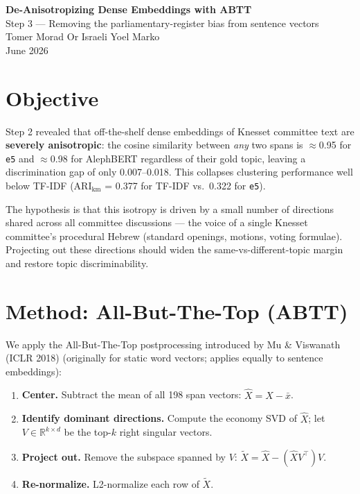 \documentclass[11pt,a4paper]{article}
\begin{document}
\begin{center}
  {\LARGE \textbf{De-Anisotropizing Dense Embeddings with ABTT}}\\[0.3em]
  {\large Step 3 --- Removing the parliamentary-register bias from sentence vectors}\\[0.6em]
  {\normalsize Tomer Morad \quad Or Israeli \quad Yoel Marko}\\
  {\normalsize June 2026}
\end{center}

\vspace{0.5em}

\section{Objective}

Step 2 revealed that off-the-shelf dense embeddings of Knesset committee text are
\textbf{severely anisotropic}: the cosine similarity between \emph{any} two spans is
$\approx$0.95 for \texttt{e5} and $\approx$0.98 for AlephBERT regardless of their gold topic,
leaving a discrimination gap of only 0.007--0.018.  This collapses clustering performance
well below TF-IDF (ARI$_\text{km}$ = 0.377 for TF-IDF vs.\ 0.322 for \texttt{e5}).

The hypothesis is that this isotropy is driven by a small number of directions shared across
all committee discussions --- the voice of a single Knesset committee's procedural Hebrew
(standard openings, motions, voting formulae).  Projecting out these directions should
widen the same-vs-different-topic margin and restore topic discriminability.

\section{Method: All-But-The-Top (ABTT)}

We apply the All-But-The-Top postprocessing introduced by Mu \& Viswanath (ICLR 2018)
(originally for static word vectors; applies equally to sentence embeddings):

\begin{enumerate}[noitemsep]
  \item \textbf{Center.} Subtract the mean of all 198 span vectors: $\hat{X} = X - \bar{x}$.
  \item \textbf{Identify dominant directions.} Compute the economy SVD of $\hat{X}$;
        let $V \in \mathbb{R}^{k \times d}$ be the top-$k$ right singular vectors.
  \item \textbf{Project out.} Remove the subspace spanned by $V$:
        $\tilde{X} = \hat{X} - (\hat{X} V^\top) V$.
  \item \textbf{Re-normalize.} L2-normalize each row of $\tilde{X}$.
\end{enumerate}
\end{document}
